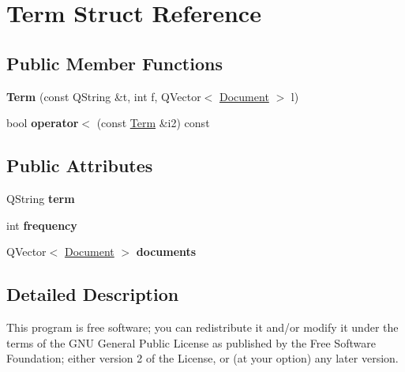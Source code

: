 \hypertarget{structTerm}{
\section{Term Struct Reference}
\label{structTerm}
}
\subsection*{Public Member Functions}
\begin{DoxyCompactItemize}
\item 
\hypertarget{structTerm_a7817282d09062435dde4f3c06b88037f}{
{\bfseries Term} (const QString \&t, int f, QVector$<$ \hyperlink{structDocument}{Document} $>$ l)}
\label{structTerm_a7817282d09062435dde4f3c06b88037f}

\item 
\hypertarget{structTerm_a427e9f7eec99db3169c7e89ed574578a}{
bool {\bfseries operator$<$} (const \hyperlink{structTerm}{Term} \&i2) const }
\label{structTerm_a427e9f7eec99db3169c7e89ed574578a}

\end{DoxyCompactItemize}
\subsection*{Public Attributes}
\begin{DoxyCompactItemize}
\item 
\hypertarget{structTerm_ac456d5e5115b0fdb216d7799e281251f}{
QString {\bfseries term}}
\label{structTerm_ac456d5e5115b0fdb216d7799e281251f}

\item 
\hypertarget{structTerm_a690212a9940c46b794e8195640bdd230}{
int {\bfseries frequency}}
\label{structTerm_a690212a9940c46b794e8195640bdd230}

\item 
\hypertarget{structTerm_a7ab15121a638a5314f3a131832c97f90}{
QVector$<$ \hyperlink{structDocument}{Document} $>$ {\bfseries documents}}
\label{structTerm_a7ab15121a638a5314f3a131832c97f90}

\end{DoxyCompactItemize}


\subsection{Detailed Description}
This program is free software; you can redistribute it and/or modify it under the terms of the GNU General Public License as published by the Free Software Foundation; either version 2 of the License, or (at your option) any later version.

